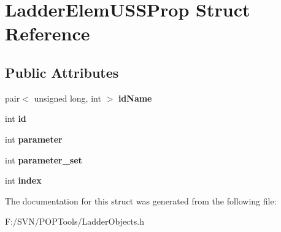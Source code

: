 \hypertarget{struct_ladder_elem_u_s_s_prop}{\section{Ladder\-Elem\-U\-S\-S\-Prop Struct Reference}
\label{struct_ladder_elem_u_s_s_prop}
}
\subsection*{Public Attributes}
\begin{DoxyCompactItemize}
\item 
\hypertarget{struct_ladder_elem_u_s_s_prop_a2df334662adb55e84df2abc9cd6c057b}{pair$<$ unsigned long, int $>$ {\bfseries id\-Name}}\label{struct_ladder_elem_u_s_s_prop_a2df334662adb55e84df2abc9cd6c057b}

\item 
\hypertarget{struct_ladder_elem_u_s_s_prop_a0ebf189f7d975487a732f42fcf2c7a2c}{int {\bfseries id}}\label{struct_ladder_elem_u_s_s_prop_a0ebf189f7d975487a732f42fcf2c7a2c}

\item 
\hypertarget{struct_ladder_elem_u_s_s_prop_a5ea1622232b1fff71fa9aaf986abb2b0}{int {\bfseries parameter}}\label{struct_ladder_elem_u_s_s_prop_a5ea1622232b1fff71fa9aaf986abb2b0}

\item 
\hypertarget{struct_ladder_elem_u_s_s_prop_a626a4bff485f1957006f9e0e13bee190}{int {\bfseries parameter\-\_\-set}}\label{struct_ladder_elem_u_s_s_prop_a626a4bff485f1957006f9e0e13bee190}

\item 
\hypertarget{struct_ladder_elem_u_s_s_prop_aceb20ca23763517667174908954adf35}{int {\bfseries index}}\label{struct_ladder_elem_u_s_s_prop_aceb20ca23763517667174908954adf35}

\end{DoxyCompactItemize}


The documentation for this struct was generated from the following file\-:\begin{DoxyCompactItemize}
\item 
F\-:/\-S\-V\-N/\-P\-O\-P\-Tools/Ladder\-Objects.\-h\end{DoxyCompactItemize}
